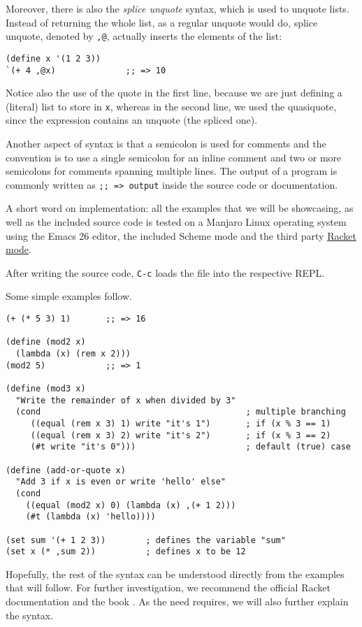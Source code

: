 Moreover, there is also the \emph{splice unquote} syntax, which
is used to unquote lists. Instead of returning the whole list,
as a regular unquote would do, splice unquote, denoted by
\texttt{,{@}}, actually inserts the elements of the list:
{
  \small
\begin{verbatim}
(define x '(1 2 3))
`(+ 4 ,@x)              ;; => 10
\end{verbatim}
}
Notice also the use of the quote in the first line, because we
are just defining a (literal) list to store in \texttt{x}, whereas
in the second line, we used the quasiquote, since the expression
contains an unquote (the spliced one).

Another aspect of syntax is that a semicolon is used for comments and
the convention is to use a single semicolon for an inline comment
and two or more semicolons for comments spanning multiple lines.
The output of a program is commonly written as \texttt{;; => output}
inside the source code or documentation.

\begin{remark}\label{rk:implementation}
  A short word on implementation: all the examples that we will be
  showcasing, as well as the included source code is tested on a
  Manjaro Linux operating system using the Emacs 26 editor, the
  included Scheme mode and the third party
  \href{https://www.racket-mode.com/}{Racket mode}.

  After writing the source code, \texttt{C-c} loads the file into
  the respective REPL.
\end{remark}

Some simple examples follow.
{
  \small
\begin{verbatim}
(+ (* 5 3) 1)       ;; => 16

(define (mod2 x)
  (lambda (x) (rem x 2)))
(mod2 5)            ;; => 1

(define (mod3 x)
  "Write the remainder of x when divided by 3"
  (cond                                         ; multiple branching
     ((equal (rem x 3) 1) write "it's 1")       ; if (x % 3 == 1)
     ((equal (rem x 3) 2) write "it's 2")       ; if (x % 3 == 2)
     (#t write "it's 0")))                      ; default (true) case

(define (add-or-quote x)
  "Add 3 if x is even or write 'hello' else"
  (cond
    ((equal (mod2 x) 0) (lambda (x) ,(+ 1 2)))
    (#t (lambda (x) 'hello))))

(set sum '(+ 1 2 3))        ; defines the variable "sum"
(set x (* ,sum 2))          ; defines x to be 12
\end{verbatim}
}

\vspace{0.3cm}

Hopefully, the rest of the syntax can be understood directly from
the examples that will follow. For further investigation, we recommend
the official Racket documentation \cite{racket} and the book
\cite{htdp}. As the need requires, we will also further explain the syntax.




